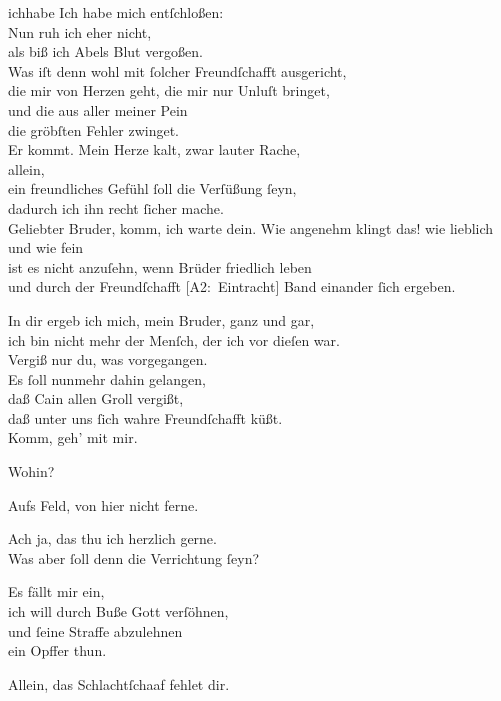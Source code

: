 \documentclass[abbrwidth=6em,tocstyle=ref-genre]{ees}
\newcommand\altlyrics[1]{[\textmd{A2}:~#1]}
\begin{document}
{\begin{movement}{ichhabe}
  \voice[Cain]
  Ich habe mich entſchloßen:\\
  Nun ruh ich eher nicht,\\
  als biß ich Abels Blut vergoßen.\\
  Was iſt denn wohl mit ſolcher Freundſchafft ausgericht,\\
  die mir von Herzen geht, die mir nur Unluſt bringet,\\
  und die aus aller meiner Pein\\
  die gröbſten Fehler zwinget.\\
  Er kommt. Mein Herze kalt, zwar lauter Rache,\\
  allein,\\
  ein freundliches Gefühl ſoll die Verſüßung ſeyn,\\
  dadurch ich ihn recht ſicher mache.\\
  Geliebter Bruder, komm, ich warte dein.
  \clearpage
  \voice[Abel]
  Wie angenehm klingt das! wie lieblich und wie fein\\
  ist es nicht anzuſehn, wenn Brüder friedlich leben\\
  und durch der Freundſchafft \altlyrics{Eintracht} Band einander ſich ergeben.

  \voice[Cain]
  In dir ergeb ich mich, mein Bruder, ganz und gar,\\
  ich bin nicht mehr der Menſch, der ich vor dieſen war.\\
  Vergiß nur du, was vorgegangen.\\
  Es ſoll nunmehr dahin gelangen,\\
  daß Cain allen Groll vergißt,\\
  daß unter uns ſich wahre Freundſchafft küßt.\\
  Komm, geh’ mit mir.

  \voice[Abel]
  Wohin?

  \voice[Cain]
  Aufs Feld, von hier nicht ferne.

  \voice[Abel]
  Ach ja, das thu ich herzlich gerne.\\
  Was aber ſoll denn die Verrichtung ſeyn?

  \voice[Cain]
  Es fällt mir ein,\\
  ich will durch Buße Gott verſöhnen,\\
  und ſeine Straffe abzulehnen\\
  ein Opffer thun.

  \voice[Abel]
  Allein, das Schlachtſchaaf fehlet dir.


\end{movement}}
\end{document}
